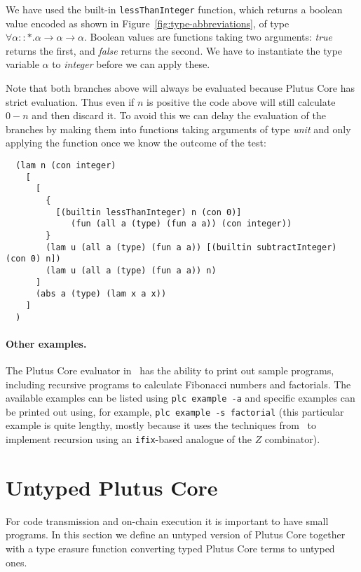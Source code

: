 \documentclass[a4paper]{article}
\begin{document}
\noindent We have used the built-in \verb|lessThanInteger|
function, which returns a boolean value encoded as shown in
Figure~\ref{fig:type-abbreviations}, of type
$\forall \alpha::\ast. \alpha \rightarrow \alpha \rightarrow \alpha$.
Boolean values are functions taking two arguments: \textit{true}
returns the first, and \textit{false} returns the second.  We have to
instantiate the type variable $\alpha$ to \textit{integer} before we
can apply these.

Note that both branches above will always be evaluated because Plutus
Core has strict evaluation.  Thus even if $n$ is positive the code above will
still calculate $0-n$ and then discard it.  To avoid this we can delay
the evaluation of the branches by making them into functions taking
arguments of type \textit{unit} and only applying the function once we
know the outcome of the test:

\begin{verbatim}
  (lam n (con integer)
    [
      [
        {
          [(builtin lessThanInteger) n (con 0)]
             (fun (all a (type) (fun a a)) (con integer))
        }
        (lam u (all a (type) (fun a a)) [(builtin subtractInteger) (con 0) n])
        (lam u (all a (type) (fun a a)) n)
      ]
      (abs a (type) (lam x a x))
    ]
  )
\end{verbatim}

\paragraph{Other examples.} The Plutus Core evaluator in~\citep{Plutus-exe-repo}
has the ability to print out sample programs, including recursive
programs to calculate Fibonacci numbers and factorials.  The available
examples can be listed using \verb|plc example -a| and specific
examples can be printed out using, for example,
\verb|plc example -s factorial| (this particular example is quite lengthy, mostly because
it uses the techniques from~\citep{unravelling-recursion} to implement
recursion using an \verb|ifix|-based analogue of the $Z$ combinator).


\section{Untyped Plutus Core}
\label{sec:untyped-plc}
For code transmission and on-chain execution it is important to have
small programs.  In this section we define an untyped version of
Plutus Core together with a type erasure function converting typed
Plutus Core terms to untyped ones.
\end{document}

